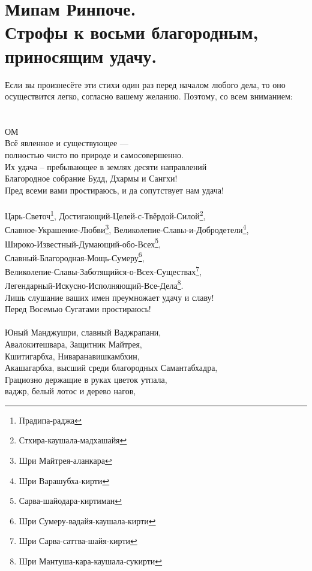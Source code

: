 \section{Мипам Ринпоче.\\Строфы к восьми благородным, \\приносящим удачу.}
\scriptsize
Если вы произнесёте эти стихи один раз перед началом любого дела,
то оно осуществится легко, согласно вашему желанию. Поэтому, со всем вниманием:\\
\normalsize
\\
\\
ОМ\\
Всё явленное и существующее — \\ \indent полностью чисто по природе и самосовершенно.\\
Их удача – пребывающее в землях десяти направлений \\
Благородное собрание Будд, Дхармы и Сангхи!\\
Пред всеми вами простираюсь, и да сопутствует нам удача!\\
\\
Царь-Светоч\footnote{Прадипа-раджа}, Достигающий-Целей-с-Твёрдой-Силой\footnote{Стхира-каушала-мадхашайя},\\
Славное-Украшение-Любви\footnote{ Шри Майтрея-аланкара},  Великолепие-Славы-и-Добродетели\footnote{ Шри Варашубха-кирти},\\
Широко-Известный-Думающий-обо-Всех\footnote{ Сарва-шайодара-киртиман},\\
Славный-Благородная-Мощь-Сумеру\footnote{ Шри Сумеру-вадайя-каушала-кирти},\\
Великолепие-Славы-Заботящийся-о-Всех-Существах\footnote{ Шри Сарва-саттва-шайя-кирти},\\
Легендарный-Искусно-Исполняющий-Все-Дела\footnote{ Шри Мантуша-кара-каушала-сукирти}. \\
Лишь слушание ваших имен преумножает удачу и славу!\\
Перед Восемью Сугатами простираюсь!\\
\\
\newpage
Юный Манджушри, славный Ваджрапани,\\
Авалокитешвара, Защитник Майтрея,\\
Кшитигарбха, Ниваранавишкамбхин,\\
Акашагарбха, высший среди благородных Самантабхадра,\\
Грациозно держащие в руках цветок утпала, \\
\indent ваджр, белый лотос и дерево нагов,\\

